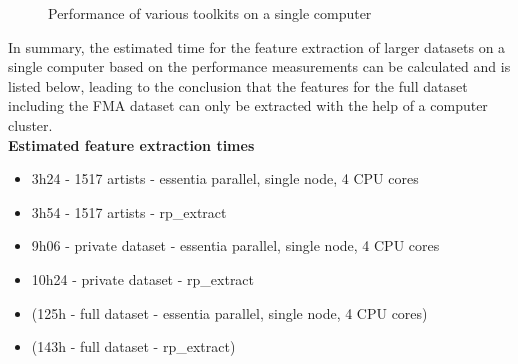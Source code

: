 \begin{figure}[htbp]
	\centering
	\caption{Performance of various toolkits on a single computer}
	\label{perfex}
\end{figure}
\noindent In summary, the estimated time for the feature extraction of larger datasets on a single computer based on the performance measurements can be calculated and is listed below, leading to the conclusion that the features for the full dataset including the FMA dataset can only be extracted with the help of a computer cluster.
\ \\
\textbf{Estimated feature extraction times}
\begin{itemize}
	\setlength\itemsep{-0.5em}
	\item 3h24 - 1517 artists - essentia parallel, single node, 4 CPU cores
	\item 3h54 - 1517 artists - rp\_extract
	\item 9h06 - private dataset - essentia parallel, single node, 4 CPU cores
	\item 10h24 - private dataset - rp\_extract
	\item (125h - full dataset - essentia parallel, single node, 4 CPU cores)
	\item (143h - full dataset - rp\_extract)
\end{itemize}

